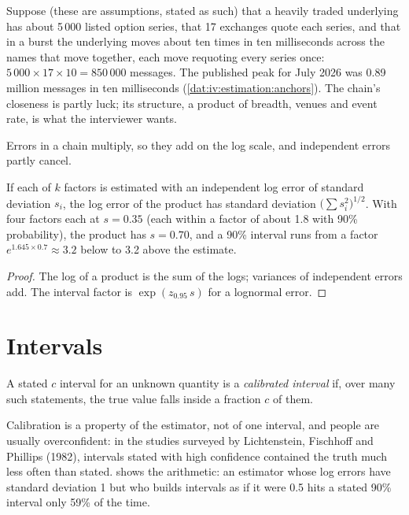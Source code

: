\begin{example}\label{ex:iv:estimation:opra}
Suppose (these are assumptions, stated as such) that a heavily traded underlying has about 5\,000 listed option
series, that 17 exchanges quote each series, and that in a burst the underlying moves about ten times in ten
milliseconds across the names that move together, each move requoting every series once: $5\,000 \times 17
\times 10 = 850\,000$ messages. The published peak for July 2026 was 0.89 million messages in ten
milliseconds (\cref{dat:iv:estimation:anchors}). The chain's closeness is partly luck; its structure, a
product of breadth, venues and event rate, is what the interviewer wants.
\end{example}

Errors in a chain multiply, so they add on the log scale, and independent errors partly cancel.

\begin{proposition}\label{prop:iv:estimation:logsd}
If each of $k$ factors is estimated with an independent log error of standard deviation $s_i$, the log error of
the product has standard deviation $\big(\sum s_i^2\big)^{1/2}$. With four factors each at $s = 0.35$ (each
within a factor of about 1.8 with 90\% probability), the product has $s = 0.70$, and a 90\% interval runs from a
factor $e^{1.645 \times 0.7} \approx 3.2$ below to 3.2 above the estimate.
\end{proposition}

\begin{proof}
The log of a product is the sum of the logs; variances of independent errors add. The interval factor is
$\exp(z_{0.95}\, s)$ for a lognormal error.
\end{proof}

\section{Intervals}

\begin{definition}\label{def:iv:estimation:calibrated}
A stated $c$ interval for an unknown quantity is a \emph{calibrated interval} if,
over many such statements, the true value falls inside a fraction $c$ of them.
\end{definition}

Calibration is a property of the estimator, not of one interval, and people are usually overconfident: in the
studies surveyed by Lichtenstein, Fischhoff and Phillips (1982), intervals stated with high confidence
contained the truth much less often than stated.  shows the arithmetic: an
estimator whose log errors have standard deviation 1 but who builds intervals as if it were 0.5 hits a stated
90\% interval only 59\% of the time.

